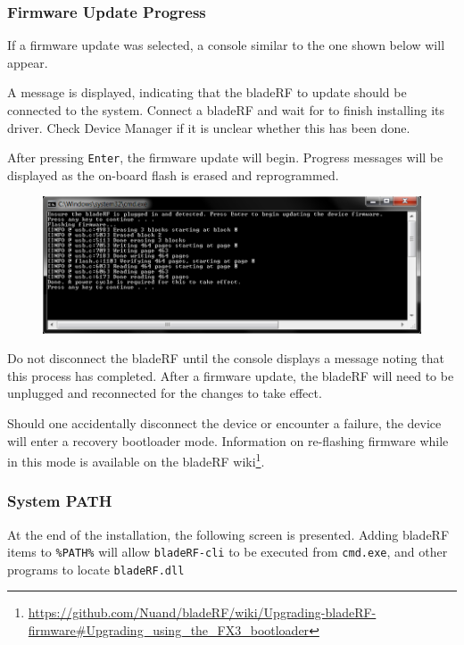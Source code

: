 {\newpage
\subsubsection{Firmware Update Progress}

If a firmware update was selected, a console similar to the one
shown below will appear.

A message is displayed, indicating that the bladeRF to update should
be connected to the system. Connect a bladeRF and wait for \windows
to finish installing its driver. Check Device Manager if it is unclear
whether this has been done.

After pressing \texttt{Enter}, the firmware update will begin.
Progress messages will be displayed as the on-board flash is
erased and reprogrammed.

\begin{figure}[h]
  \centering
  \includegraphics[width=6in]{images/windows/installer/09-fwupdate.png}
\end{figure}

Do not disconnect the bladeRF until the console displays a message
noting that this process has completed. After a firmware update, the bladeRF
will need to be unplugged and reconnected for the changes to take effect.

Should one accidentally disconnect the device or encounter a failure, the
device will enter a recovery bootloader mode. Information on re-flashing
firmware while in this mode is available on the bladeRF wiki\footnote{\url{https://github.com/Nuand/bladeRF/wiki/Upgrading-bladeRF-firmware\#Upgrading\_using\_the\_FX3\_bootloader}}.

\newpage
\subsubsection{System PATH}

At the end of the installation, the following screen is presented.
Adding bladeRF items to \texttt{\%PATH\%} will allow \texttt{bladeRF-cli}
to be executed from \texttt{cmd.exe}, and other programs to locate \texttt{bladeRF.dll}

}
